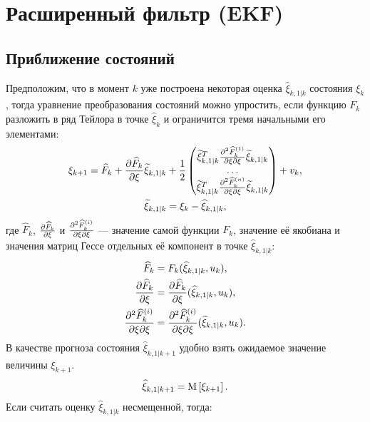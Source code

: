 \section{Расширенный фильтр (EKF)}

\subsection{Приближение состояний}

Предположим, что в момент $k$ уже построена некоторая оценка $\widehat{\xi}_{k,1|k}$ состояния $\xi_k$, тогда уравнение преобразования состояний можно упростить, если
функцию $F_k$ разложить в ряд Тейлора в точке $\widehat{\xi}_k$ и ограничится тремя начальными его элементами:
\begin{gather}
    \xi_{k+1}
        = \widehat{F}_k
        + \frac{\partial \widehat{F}_k}{\partial \xi} \widetilde{\xi}_{k,1|k}
        + \frac{1}{2}
            \begin{pmatrix}
                \widetilde{\xi}_{k,1|k}^T \frac{\partial^2 \widehat{F}_k^{(1)}}{{\partial \xi}{\partial \xi}} \widetilde{\xi}_{k,1|k} \\
                \dots \\
                \widetilde{\xi}_{k,1|k}^T \frac{\partial^2 \widehat{F}_k^{(n)}}{{\partial \xi}{\partial \xi}} \widetilde{\xi}_{k,1|k}
            \end{pmatrix}
        + v_k,
        \label{equation:filtering:in_state:extended_kalman:state} \\
    \widetilde{\xi}_{k,1|k} = \xi_k - \widehat{\xi}_{k,1|k}
        \notag,
\end{gather}
где $\widehat{F}_k$, $\frac{\partial \widehat{F}_k}{\partial \xi}$ и $\frac{\partial^2 \widehat{F}_k^{(i)}}{{\partial \xi}{\partial \xi}}$ --- значение самой функции $F_k$, значение её якобиана и значения
матриц Гессе отдельных её компонент в точке $\widehat{\xi}_{k,1|k}$:
\begin{align*}
    \widehat{F}_k                         & = F_k ( \widehat{\xi}_{k,1|k}, u_k ) , \\
    \frac{\partial \widehat{F}_k}{\partial \xi}           & = \frac{\partial \widehat{F}_k}{\partial \xi} ( \widehat{\xi}_{k,1|k}, u_k ), \\
    \frac{\partial^2 \widehat{F}_k^{(i)}}{{\partial \xi}{\partial \xi}} & = \frac{\partial^2 \widehat{F}_k^{(i)}}{{\partial \xi}{\partial \xi}} ( \widehat{\xi}_{k,1|k}, u_k )
    .
\end{align*}
В качестве прогноза состояния $\widehat{\xi}_{k,1|k+1}$ удобно взять ожидаемое значение величины $\xi_{k+1}$.
$$
    \widehat{\xi}_{k,1|k+1} = \mathrm{M} \left [ \xi_{k+1} \right ].
$$
Если считать оценку $\widehat{\xi}_{k,1|k}$ несмещенной, тогда:
